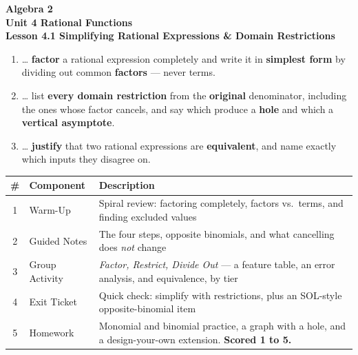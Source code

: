 \documentclass[10pt]{article}
\begin{document}
\vspace{-0.8in}

\begin{center}
  {\color{white}\textbf{\LARGE Algebra 2}}\\[4pt]
  {\color{forestmid}\large\textbf{Unit 4 \quad Rational Functions}}\\[6pt]
  {\color{white}\textbf{\large Lesson 4.1 \quad Simplifying Rational Expressions \& Domain Restrictions}}
\end{center}

\vspace{0.22in}
\namedateperiod
\vspace{0.18in}

\begin{learningtargetbox}
\small
\begin{enumerate}[leftmargin=1.5em, itemsep=5pt]
  \item \ldots{} \textbf{factor} a rational expression completely and write it in \textbf{simplest form} by dividing out common \textbf{factors} --- never terms.
  \item \ldots{} list \textbf{every domain restriction} from the \textbf{original} denominator, including the ones whose factor cancels, and say which produce a \textbf{hole} and which a \textbf{vertical asymptote}.
  \item \ldots{} \textbf{justify} that two rational expressions are \textbf{equivalent}, and name exactly which inputs they disagree on.
\end{enumerate}
\end{learningtargetbox}

\vspace{0.14in}

\begin{tocbox}
\small
\renewcommand{\arraystretch}{1.5}
\begin{tabularx}{\linewidth}{@{} c l X @{}}
\rowcolor{forestbg}
\textbf{\#} & \textbf{Component} & \textbf{Description} \\
\midrule
1 & Warm-Up        & Spiral review: factoring completely, factors vs.\ terms, and finding excluded values \\
2 & Guided Notes   & The four steps, opposite binomials, and what cancelling does \emph{not} change \\
3 & Group Activity & \emph{Factor, Restrict, Divide Out} --- a feature table, an error analysis, and equivalence, by tier \\
4 & Exit Ticket    & Quick check: simplify with restrictions, plus an SOL-style opposite-binomial item \\
5 & Homework       & Monomial and binomial practice, a graph with a hole, and a design-your-own extension. \textbf{Scored 1 to 5.} \\
\end{tabularx}
\end{tocbox}
\end{document}
